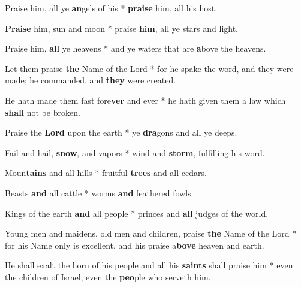 \begin{multicols}{2}
	Praise him, all ye \textbf{an}gels of his * \textbf{praise} him, all his host.
	
	\textbf{Praise} him, sun and moon * praise \textbf{him}, all ye stars and light.
	
	Praise him, \textbf{all} ye heavens * and ye waters that are \textbf{a}bove the heavens.
	
	Let them praise \textbf{the} Name of the Lord * for he spake the word, and they were made; he commanded, and \textbf{they} were created.
	
	He hath made them fast fore\textbf{ver} and ever * he hath given them a law which \textbf{shall} not be broken.
	
	Praise the \textbf{Lord} upon the earth * ye \textbf{dra}gons and all ye deeps.
	
	Fail and hail, \textbf{snow}, and vapors * wind and \textbf{storm}, fulfilling his word.
	
	Moun\textbf{tains} and all hills * fruitful \textbf{trees} and all cedars.
	
	Beasts \textbf{and} all cattle * worms \textbf{and} feathered fowls.
	
	Kings of the earth \textbf{and} all people * princes and \textbf{all} judges of the world.
	
	Young men and maidens, old men and children, praise \textbf{the} Name of the Lord * for his Name only is excellent, and his praise a\textbf{bove} heaven and earth.
	
	He shall exalt the horn of his people and all his \textbf{saints} shall praise him * even the children of Israel, even the \textbf{peo}ple who serveth him.
\end{multicols}